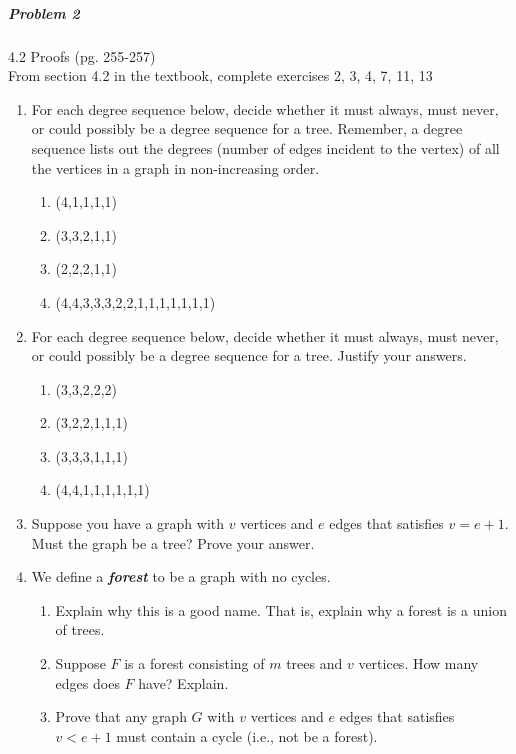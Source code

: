 \documentclass[11pt,a4paper]{article}
\newcommand\setItemNumber[1]{\setcounter{enumi}{\numexpr#1-1\relax}}
\begin{document}
	\subparagraph{Problem 2} 4.2 Proofs (pg. 255-257) \\
	
		From section 4.2 in the textbook, complete exercises 2, 3, 4, 7, 11, 13

        \begin{enumerate}

        \setItemNumber{2}
        \item For each degree sequence below, decide whether it must always, must never, or could possibly be a degree sequence for a tree. Remember, a degree sequence lists out the degrees (number of edges incident to the vertex) of all the vertices in a graph in non-increasing order.

            \begin{enumerate}
                \item (4,1,1,1,1)
                \item (3,3,2,1,1)
                \item (2,2,2,1,1)
                \item (4,4,3,3,3,2,2,1,1,1,1,1,1,1)

            \end{enumerate}

        \item For each degree sequence below, decide whether it must always, must never, or could possibly be a degree sequence for a tree. Justify your answers.

            \begin{enumerate}
                \item (3,3,2,2,2)
                \item (3,2,2,1,1,1)
                \item (3,3,3,1,1,1)
                \item (4,4,1,1,1,1,1,1)
            \end{enumerate}

        \item Suppose you have a graph with $v$ vertices and $e$ edges that satisfies $v=e+1$. Must the graph be a tree? Prove your answer.

        \setItemNumber{7}
        \item We define a \textbf{\emph{forest}} to be a graph with no cycles.
            \begin{enumerate}
                \item Explain why this is a good name. That is, explain why a forest is a union of trees.
                \item Suppose $F$ is a forest consisting of $m$ trees and $v$ vertices. How many edges does $F$ have? Explain.
                \item Prove that any graph $G$ with $v$ vertices and $e$ edges that satisfies $v<e+1$ must contain a cycle (i.e., not be a forest).
            \end{enumerate}


\end{enumerate}
\end{document}
